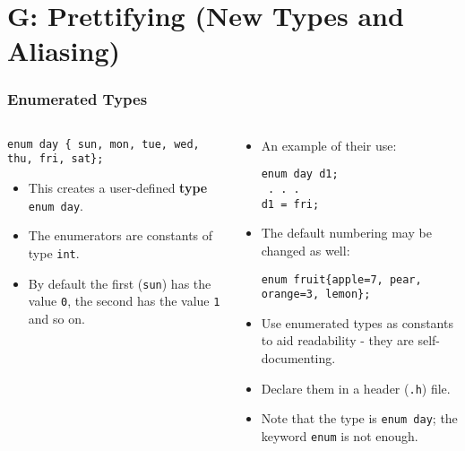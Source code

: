 \section{G: Prettifying (New Types and Aliasing)}

\begin{frame}[fragile]
\frametitle{Enumerated Types}
\begin{columns}
\begin{column}{0.45\textwidth}
{\small
\begin{verbatim}
enum day { sun, mon, tue, wed, thu, fri, sat};
\end{verbatim}
}

\begin{itemize}[<+->]
\item This creates a user-defined {\bf type} \verb^enum day^.
\item The enumerators are constants of type \verb^int^.
\item By default the first (\verb^sun^) has the value \verb^0^,
the second has the value \verb^1^ and so on.
\end{itemize}
\end{column}

\pause
\begin{column}{0.45\textwidth}
\begin{itemize}[<+->]
\item An example of their use:
\begin{verbatim}
enum day d1;
 . . .
d1 = fri;
\end{verbatim}
\item The default numbering may be changed as well:
{\small
\begin{verbatim}
enum fruit{apple=7, pear, orange=3, lemon};
\end{verbatim}
}
\item Use enumerated types as constants to aid readability -
they are self-documenting.
\item Declare them in a header (\verb^.h^) file.
\item Note that the type is \verb^enum day^; the
keyword \verb^enum^ is not enough.
\end{itemize}
\end{column}


\end{columns}
\end{frame}

